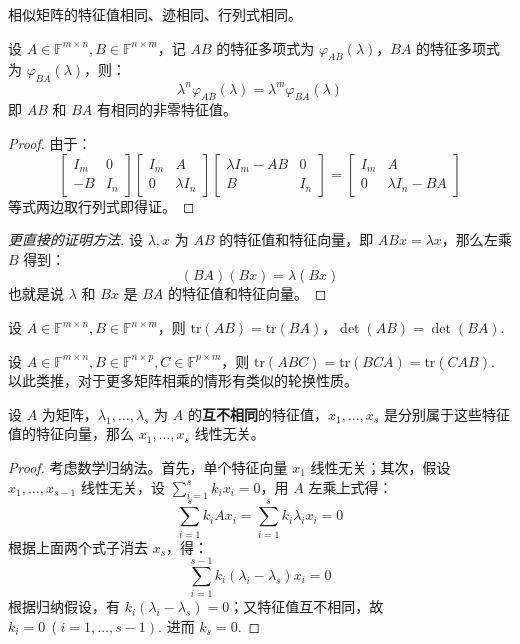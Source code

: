 \begin{corollary}
相似矩阵的特征值相同、迹相同、行列式相同。
\end{corollary}

\begin{theorem}[$AB$ 和 $BA$ 有相同的非零特征值]
\label{thm:eigen-ab-ba}
设 $A\in\mathbb F^{m\times n},B\in\mathbb F^{n\times m}$，记 $AB$ 的特征多项式为 $\varphi_{AB}(\lambda)$，$BA$ 的特征多项式为 $\varphi_{BA}(\lambda)$，则：
\[
    \lambda^n\varphi_{AB}(\lambda)=\lambda^m\varphi_{BA}(\lambda)
\]
即 $AB$ 和 $BA$ 有相同的非零特征值。
\end{theorem}
\begin{proof}
由于：
\[
    \begin{bmatrix}I_m&0\\-B&I_n\end{bmatrix}\begin{bmatrix}I_m&A\\0&\lambda I_n\end{bmatrix}\begin{bmatrix}\lambda I_m-AB&0\\B&I_n\end{bmatrix}=\begin{bmatrix}I_m&A\\0&\lambda I_n-BA\end{bmatrix}
\]
等式两边取行列式即得证。
\end{proof}
\begin{proof}[更直接的证明方法]
设 $\lambda,x$ 为 $AB$ 的特征值和特征向量，即 $ABx=\lambda x$，那么左乘 $B$ 得到：\[(BA)(Bx)=\lambda (Bx)\]
也就是说 $\lambda$ 和 $Bx$ 是 $BA$ 的特征值和特征向量。
\end{proof}

\begin{corollary}
设 $A\in\mathbb F^{m\times n},B\in\mathbb F^{n\times m}$，则 $\text{tr}(AB)=\text{tr}(BA)$，$\det(AB)=\det(BA)$.
\end{corollary}

\begin{corollary}
\label{cor:trace}
设 $A\in\mathbb F^{m\times n},B\in\mathbb F^{n\times p},C\in\mathbb F^{p\times m}$，则 $\text{tr}(ABC)=\text{tr}(BCA)=\text{tr}(CAB)$. 以此类推，对于更多矩阵相乘的情形有类似的轮换性质。
\end{corollary}

\begin{theorem}[特征向量的线性无关性]
\label{thm:eigenind}
设 $A$ 为矩阵，$\lambda_1,\ldots,\lambda_s$ 为 $A$ 的\textbf{互不相同}的特征值，$x_1,\ldots,x_s$ 是分别属于这些特征值的特征向量，那么 $x_1,\ldots,x_s$ 线性无关。
\end{theorem}
\begin{proof}
考虑数学归纳法。首先，单个特征向量 $x_1$ 线性无关；其次，假设 $x_1,\ldots,x_{s-1}$ 线性无关，设 $\sum_{i=1}^s k_ix_i=0$，用 $A$ 左乘上式得：
\[
    \sum_{i=1}^sk_iAx_i=\sum_{i=1}^sk_i\lambda_ix_i=0
\]
根据上面两个式子消去 $x_s$，得：
\[
    \sum_{i=1}^{s-1}k_i(\lambda_i-\lambda_s)x_i=0
\]
根据归纳假设，有 $k_i(\lambda_i-\lambda_s)=0$；又特征值互不相同，故 $k_i=0\ (i=1,\ldots,s-1)$. 进而 $k_s=0$.
\end{proof}

